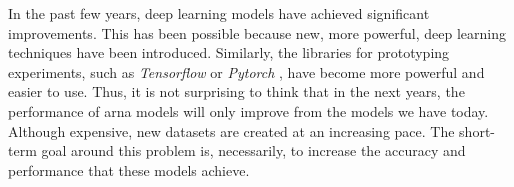 

In the past few years, deep learning models have achieved
significant improvements. This has been possible because
new, more powerful, deep learning techniques have been
introduced. Similarly, the libraries for prototyping
experiments, such as \emph{Tensorflow}
\parencite{abadi2016tensorflow} or \emph{Pytorch}
\parencite{paszke2019pytorch}, have become more powerful and
easier to use. Thus, it is not surprising to think that in
the next years, the performance of \gls{arna} models will
only improve from the models we have today. Although
expensive, new datasets are created at an increasing pace.
The short-term goal around this problem is, necessarily, to
increase the accuracy and performance that these models
achieve.
